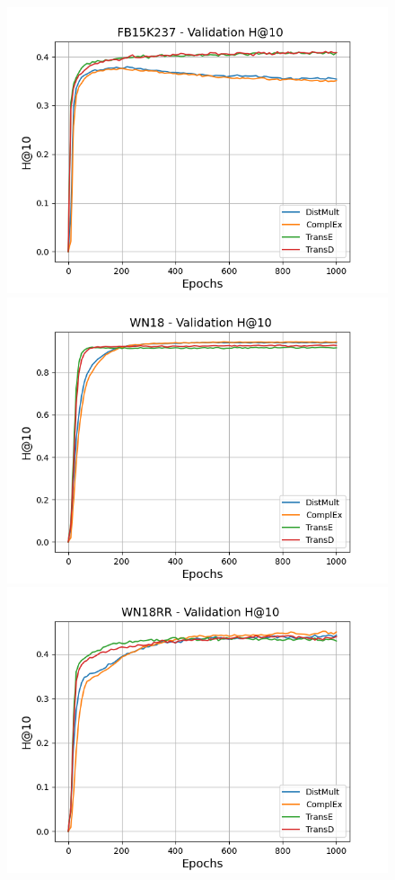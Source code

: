 \begin{figure}
    \begin{minipage}{.3\textwidth}
      \centering
      \includegraphics[width=\linewidth]{figures/results/pretrain/fb15k237/pretrain_fb15k237_hit10.png}
    \end{minipage}%
     \begin{minipage}{.3\textwidth}
      \centering
      \includegraphics[width=0.9\linewidth]{figures/results/pretrain/wn18/pretrain_wn18_hit10.png}
    \end{minipage}%
     \begin{minipage}{.3\textwidth}
      \centering
      \includegraphics[width=0.9\linewidth]{figures/results/pretrain/wn18rr/pretrain_wn18rr_hit10.png}

\end{minipage}
\end{figure}
